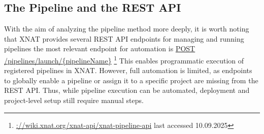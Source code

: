 \subsection{The Pipeline and the REST API}
With the aim of analyzing the pipeline method more deeply, it is worth noting that XNAT provides several REST API endpoints for managing and running pipelines the most relevant endpoint for automation is \url{POST /pipelines/launch/{pipelineName}} \footnote{\url{://wiki.xnat.org/xnat-api/xnat-pipeline-api} last accessed 10.09.2025}
This enables programmatic execution of registered pipelines in XNAT. However, full automation is limited, as endpoints to globally enable a pipeline or assign it to a specific project are missing from the REST API. Thus, while pipeline execution can be automated, deployment and project-level setup still require manual steps.



